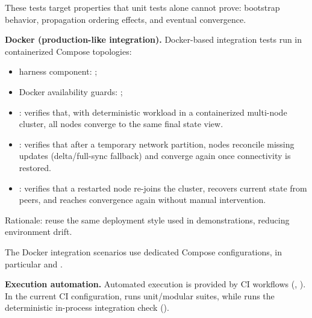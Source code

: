 These tests target properties that unit tests alone cannot prove: bootstrap behavior, propagation ordering effects, and eventual convergence.

\textbf{Docker (production-like integration).}
Docker-based integration tests run in containerized Compose topologies:
\begin{itemize}
  \item harness component: ;
  \item Docker availability guards: ;
  \item {}: verifies that, with deterministic workload in a containerized multi-node cluster, all nodes converge to the same final state view.
  \item {}: verifies that after a temporary network partition, nodes reconcile missing updates (delta/full-sync fallback) and converge again once connectivity is restored.
  \item {}: verifies that a restarted node re-joins the cluster, recovers current state from peers, and reaches convergence again without manual intervention.
\end{itemize}

Rationale: reuse the same deployment style used in demonstrations, reducing environment drift.

The Docker integration scenarios use dedicated Compose configurations, in particular  and .

\textbf{Execution automation.}
Automated execution is provided by CI workflows (, ). In the current CI configuration,  runs unit/modular suites, while  runs the deterministic in-process integration check ().

